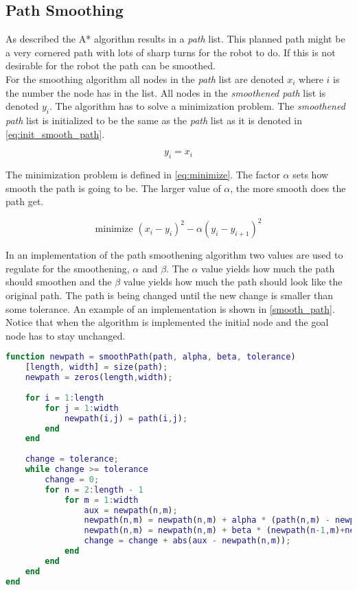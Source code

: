 \subsection{Path Smoothing} %
\label{sub:path_smoothing}

As described the A* algorithm results in a \emph{path} list. This planned path might be a very cornered path with lots of sharp turns for the robot to do. If this is not desirable for the robot the path can be smoothed. \\

For the smoothing algorithm all nodes in the \emph{path} list are denoted $x_i$ where $i$ is the number the node has in the list. All nodes in the \emph{smoothened path} list is denoted $y_i$. The algorithm has to solve a minimization problem. The \emph{smoothened path} list is initialized to be the same as the \emph{path} list as it is denoted in \autoref{eq:init_smooth_path}.

\begin{equation}
\label{eq:init_smooth_path}
y_i = x_i
\end{equation}

The minimization problem is defined in \autoref{eq:minimize}. The factor $\alpha$ sets how smooth the path is going to be. The larger value of $\alpha$, the more smooth does the path get. 

\begin{equation}
\label{eq:minimize}
\text{minimize\ } (x_i - y_i)^2 - \alpha (y_i - y_{i+1})^2
\end{equation}

In an implementation of the path smoothening algorithm two values are used to regulate for the smoothening, $\alpha$ and $\beta$. The $\alpha$ value yields how much the path should smoothen and the $\beta$ value yields how much the path should look like the original path. The path is being changed until the new change is smaller than some tolerance. An example of an implementation is shown in \autoref{smooth_path}. Notice that when the algorithm is implemented the initial node and the goal node has to stay unchanged.

\begin{lstlisting}[caption=Implementation example of path smoothing., label=smooth_path, language=Matlab]
function newpath = smoothPath(path, alpha, beta, tolerance)
    [length, width] = size(path);
    newpath = zeros(length,width);
    
    for i = 1:length
        for j = 1:width
            newpath(i,j) = path(i,j);
        end
    end
    
    change = tolerance;
    while change >= tolerance
        change = 0;
        for n = 2:length - 1
            for m = 1:width
                aux = newpath(n,m);
                newpath(n,m) = newpath(n,m) + alpha * (path(n,m) - newpath(n,m));
                newpath(n,m) = newpath(n,m) + beta * (newpath(n-1,m)+newpath(n+1,m)-2*newpath(n,m));
                change = change + abs(aux - newpath(n,m));
            end
        end
    end
end
\end{lstlisting}

